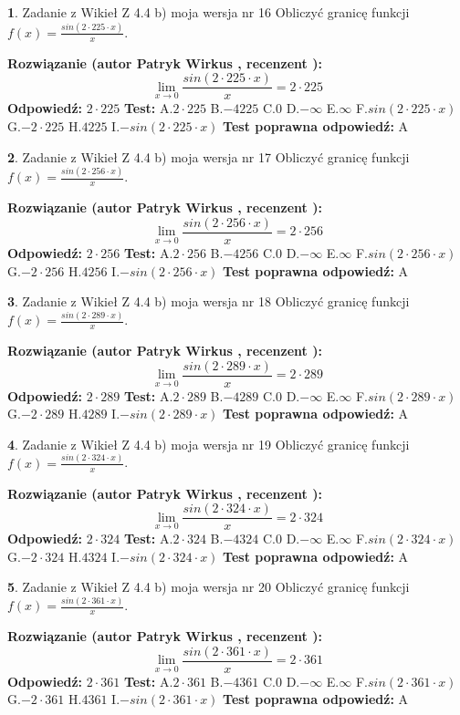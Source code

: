 \documentclass[12pt, a4paper]{article}
\theoremstyle{definition} %
\newtheorem{zad}{}
\newcommand{\zadStart}[1]{\begin{zad}#1\newline}
\newcommand{\zadStop}{\end{zad}}
\newcommand{\rozwStart}[2]{\noindent \textbf{Rozwiązanie (autor #1 , recenzent #2): }\newline}
\newcommand{\rozwStop}{\newline}
\newcommand{\odpStart}{\noindent \textbf{Odpowiedź:}\newline}
\newcommand{\odpStop}{\newline}
\newcommand{\testStart}{\noindent \textbf{Test:}\newline}
\newcommand{\testStop}{\newline}
\newcommand{\kluczStart}{\noindent \textbf{Test poprawna odpowiedź:}\newline}
\newcommand{\kluczStop}{\newline}
\begin{document}
\zadStart{Zadanie z Wikieł Z 4.4 b) moja wersja nr 16}
Obliczyć granicę funkcji $f(x)=\frac{sin(2 \cdot225\cdot x)}{x}$.
\zadStop
\rozwStart{Patryk Wirkus}{}
$$\lim\limits_{x\to 0}\frac{sin(2 \cdot 225\cdot x)}{x}=
2 \cdot 225$$
\rozwStop
\odpStart
$2 \cdot 225$
\odpStop
\testStart
A.$2 \cdot 225$
B.$-4225$
C.$0$
D.$-\infty$
E.$\infty$
F.$sin(2 \cdot 225\cdot x)$
G.$-2 \cdot 225$
H.$4225$
I.$-sin(2 \cdot 225\cdot x)$
\testStop
\kluczStart
A
\kluczStop



\zadStart{Zadanie z Wikieł Z 4.4 b) moja wersja nr 17}
Obliczyć granicę funkcji $f(x)=\frac{sin(2 \cdot256\cdot x)}{x}$.
\zadStop
\rozwStart{Patryk Wirkus}{}
$$\lim\limits_{x\to 0}\frac{sin(2 \cdot 256\cdot x)}{x}=
2 \cdot 256$$
\rozwStop
\odpStart
$2 \cdot 256$
\odpStop
\testStart
A.$2 \cdot 256$
B.$-4256$
C.$0$
D.$-\infty$
E.$\infty$
F.$sin(2 \cdot 256\cdot x)$
G.$-2 \cdot 256$
H.$4256$
I.$-sin(2 \cdot 256\cdot x)$
\testStop
\kluczStart
A
\kluczStop



\zadStart{Zadanie z Wikieł Z 4.4 b) moja wersja nr 18}
Obliczyć granicę funkcji $f(x)=\frac{sin(2 \cdot289\cdot x)}{x}$.
\zadStop
\rozwStart{Patryk Wirkus}{}
$$\lim\limits_{x\to 0}\frac{sin(2 \cdot 289\cdot x)}{x}=
2 \cdot 289$$
\rozwStop
\odpStart
$2 \cdot 289$
\odpStop
\testStart
A.$2 \cdot 289$
B.$-4289$
C.$0$
D.$-\infty$
E.$\infty$
F.$sin(2 \cdot 289\cdot x)$
G.$-2 \cdot 289$
H.$4289$
I.$-sin(2 \cdot 289\cdot x)$
\testStop
\kluczStart
A
\kluczStop



\zadStart{Zadanie z Wikieł Z 4.4 b) moja wersja nr 19}
Obliczyć granicę funkcji $f(x)=\frac{sin(2 \cdot324\cdot x)}{x}$.
\zadStop
\rozwStart{Patryk Wirkus}{}
$$\lim\limits_{x\to 0}\frac{sin(2 \cdot 324\cdot x)}{x}=
2 \cdot 324$$
\rozwStop
\odpStart
$2 \cdot 324$
\odpStop
\testStart
A.$2 \cdot 324$
B.$-4324$
C.$0$
D.$-\infty$
E.$\infty$
F.$sin(2 \cdot 324\cdot x)$
G.$-2 \cdot 324$
H.$4324$
I.$-sin(2 \cdot 324\cdot x)$
\testStop
\kluczStart
A
\kluczStop



\zadStart{Zadanie z Wikieł Z 4.4 b) moja wersja nr 20}
Obliczyć granicę funkcji $f(x)=\frac{sin(2 \cdot361\cdot x)}{x}$.
\zadStop
\rozwStart{Patryk Wirkus}{}
$$\lim\limits_{x\to 0}\frac{sin(2 \cdot 361\cdot x)}{x}=
2 \cdot 361$$
\rozwStop
\odpStart
$2 \cdot 361$
\odpStop
\testStart
A.$2 \cdot 361$
B.$-4361$
C.$0$
D.$-\infty$
E.$\infty$
F.$sin(2 \cdot 361\cdot x)$
G.$-2 \cdot 361$
H.$4361$
I.$-sin(2 \cdot 361\cdot x)$
\testStop
\kluczStart
A
\kluczStop
\end{document}
